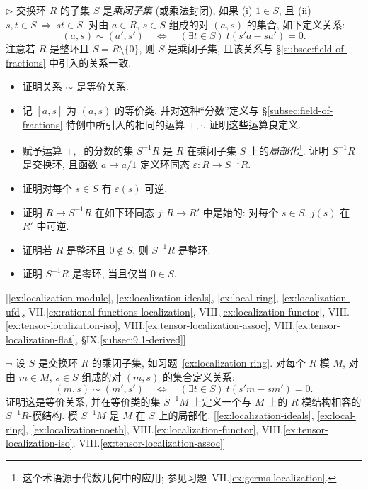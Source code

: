 \begin{prob}
\label{ex:localization-ring}
$\triangleright$ 交换环 $R$ 的子集 $S$ 是\emph{乘闭子集} (或乘法封闭), 如果 (i) $1\in S$, 且 (ii) $s,t\in S\ \Longrightarrow\ st\in S$. 对由 $a\in R$, $s\in S$ 组成的对 $(a,s)$ 的集合, 如下定义关系:
\[
(a,s)\sim (a',s')\quad\Longleftrightarrow\quad (\exists t\in S)\ t(s'a-sa')=0.
\]
注意若 $R$ 是整环且 $S=R\setminus\{0\}$, 则 $S$ 是乘闭子集, 且该关系与 §\ref{subsec:field-of-fractions} 中引入的关系一致.
\begin{itemize}
\item 证明关系 $\sim$ 是等价关系.
\item 记 $[a,s]$ 为 $(a,s)$ 的等价类, 并对这种``分数''定义与 §\ref{subsec:field-of-fractions} 特例中所引入的相同的运算 $+,\cdot$. 证明这些运算良定义.
\item 赋予运算 $+,\cdot$ 的分数的集 $S^{-1}R$ 是 $R$ 在乘闭子集 $S$ 上的\emph{局部化}\footnote{这个术语源于代数几何中的应用; 参见习题~VII.\ref{ex:germs-localization}.}. 证明 $S^{-1}R$ 是交换环, 且函数 $a\mapsto a/1$ 定义环同态 $\varepsilon:R\to S^{-1}R$.
\item 证明对每个 $s\in S$ 有 $\varepsilon(s)$ 可逆.
\item 证明 $R\to S^{-1}R$ 在如下环同态 $j:R\to R'$ 中是始的: 对每个 $s\in S$, $j(s)$ 在 $R'$ 中可逆.
\item 证明若 $R$ 是整环且 $0\notin S$, 则 $S^{-1}R$ 是整环. 
\item 证明 $S^{-1}R$ 是零环, 当且仅当 $0\in S$.
\end{itemize}
[\ref{ex:localization-module}, \ref{ex:localization-ideals}, \ref{ex:local-ring}, \ref{ex:localization-ufd}, VII.\ref{ex:rational-functions-localization}, VIII.\ref{ex:localization-functor}, VIII.\ref{ex:tensor-localization-iso}, VIII.\ref{ex:tensor-localization-assoc}, VIII.\ref{ex:tensor-localization-flat}, §IX.\ref{subsec:9.1-derived}]
\end{prob}

\begin{prob}
\label{ex:localization-module}
$\neg$ 设 $S$ 是交换环 $R$ 的乘闭子集, 如习题~\ref{ex:localization-ring}. 对每个 $R$-模 $M$, 对由 $m\in M$, $s\in S$ 组成的对 $(m,s)$ 的集合定义关系:
\[
(m,s)\sim (m',s')\quad\Longleftrightarrow\quad (\exists t\in S)\ t(s'm-sm')=0.
\]
证明这是等价关系, 并在等价类的集 $S^{-1}M$ 上定义一个与 $M$ 上的 $R$-模结构相容的 $S^{-1}R$-模结构. 模 $S^{-1}M$ 是 $M$ 在 $S$ 上的局部化. [\ref{ex:localization-ideals}, \ref{ex:local-ring}, \ref{ex:localization-noeth}, VIII.\ref{ex:localization-functor}, VIII.\ref{ex:tensor-localization-iso}, VIII.\ref{ex:tensor-localization-assoc}]
\end{prob}

